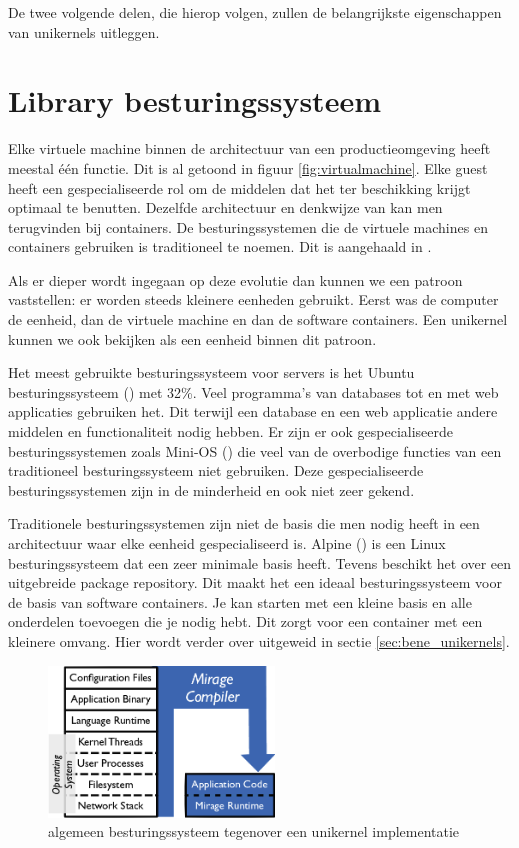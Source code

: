 \documentclass[pdftex,a4paper,12pt,twoside]{report}
\begin{document}
De twee volgende delen, die hierop volgen, zullen de belangrijkste eigenschappen van unikernels uitleggen.

\section{Library besturingssysteem}

Elke virtuele machine binnen de architectuur van een productieomgeving heeft meestal één functie. Dit is al getoond in figuur \ref{fig:virtualmachine}. Elke guest heeft een gespecialiseerde rol om de middelen dat het ter beschikking krijgt optimaal te benutten.
Dezelfde architectuur en denkwijze van kan men terugvinden bij containers. De besturingssystemen die de virtuele machines en containers gebruiken is traditioneel te noemen. Dit is aangehaald in \cite{madhavapeddy_unikernels_2013}.

Als er dieper wordt ingegaan op deze evolutie dan kunnen we een patroon vaststellen: er worden steeds kleinere eenheden gebruikt. Eerst was de computer de eenheid, dan de virtuele machine en dan de software containers. Een unikernel kunnen we ook bekijken als een eenheid binnen dit patroon.

Het meest gebruikte besturingssysteem voor servers is het Ubuntu besturingssysteem (\cite{matthias_gelbmann_ubuntu_2016}) met 32\%. Veel programma's van databases tot en met web applicaties gebruiken het. Dit terwijl een database en een web applicatie andere middelen en functionaliteit nodig hebben.
Er zijn er ook gespecialiseerde besturingssystemen zoals Mini-OS (\cite{satya_popuri_tour_????}) die veel van de overbodige functies van een traditioneel besturingssysteem niet gebruiken. Deze gespecialiseerde besturingssystemen zijn in de minderheid en ook niet zeer gekend.

Traditionele besturingssystemen zijn niet de basis die men nodig heeft in een architectuur waar elke eenheid gespecialiseerd is. Alpine (\cite{alpine_linux_development_team_alpine_????}) is een Linux besturingssysteem dat een zeer minimale basis heeft. Tevens beschikt het over een uitgebreide package repository. Dit maakt het een ideaal besturingssysteem voor de basis van software containers. Je kan starten met een kleine basis en alle onderdelen toevoegen die je nodig hebt. Dit zorgt voor een container met een kleinere omvang. Hier wordt verder over uitgeweid in sectie \ref{sec:bene_unikernels}.

\begin{figure}
    \centering
    \includegraphics[width=6cm]{img/unikernel}
    \caption{algemeen besturingssysteem tegenover een unikernel implementatie \cite{madhavapeddy_unikernels_2013}}
    \label{fig:unikernel}
\end{figure}
\end{document}
